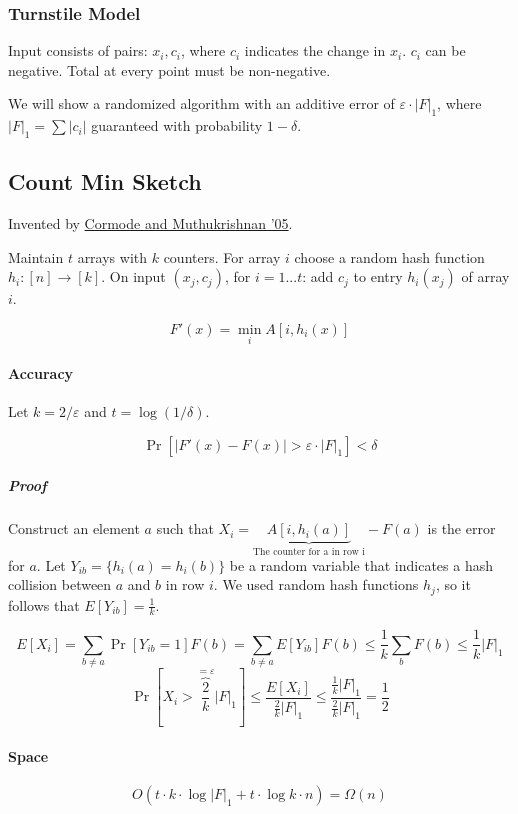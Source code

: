 \documentclass[a4paper]{article}
\begin{document}
\subsubsection{Turnstile Model}
Input consists of pairs: $x_i, c_i$, where $c_i$ indicates the change in $x_i$. $c_i$ can be negative.
Total at every point must be non-negative.

We will show a randomized algorithm with an additive error of $\varepsilon \cdot |F|_1$, where $|F|_1=\sum |c_i|$ guaranteed with probability $1-\delta$.

\subsection{Count Min Sketch}
Invented by \href{http://dimacs.rutgers.edu/~graham/pubs/papers/cm-full.pdf}{Cormode and Muthukrishnan '05}.

Maintain $t$ arrays with $k$ counters.
For array $i$ choose a random hash function $h_i:[n] \to [k]$.
On input $(x_j,c_j)$, for $i=1...t$:
add $c_j$ to entry $h_i(x_j)$ of array $i$.

\[F'(x)=\min_i A[i,h_i(x)]\]

\paragraph{Accuracy}
Let $k=2/ \varepsilon$ and $t=\log (1/\delta)$.

\[\Pr[|F'(x)-F(x)|>\varepsilon \cdot |F|_1] < \delta\]

\subparagraph{Proof}
Construct an element $a$ such that $X_i=\underbrace{A[i,h_i(a)]}_{\text{The counter for a in row i}}-F(a)$ is the error for $a$.
Let $Y_{ib}=\{h_i(a)=h_i(b)\}$ be a random variable that indicates a hash collision between $a$ and $b$ in row $i$.
We used random hash functions $h_j$, so it follows that $E[Y_{ib}]=\frac{1}{k}$.

\[E[X_i]=\sum_{b\ne a} \Pr[Y_{ib}=1]F(b)=\sum_{b\ne a} E[Y_{ib}]F(b) \le \frac{1}{k} \sum_b F(b) \le \frac{1}{k}|F|_1\]
\[\Pr[X_i > \overbrace{\frac{2}{k}}^{=\varepsilon} |F|_1] \le \frac{E[X_i]}{\frac{2}{k}|F|_1} \le \frac{\frac{1}{k}|F|_1}{\frac{2}{k}|F|_1}=\frac{1}{2} \]

\paragraph{Space}

\[O(t \cdot k \cdot \log |F|_1 + t \cdot \log k \cdot n)=\Omega(n)\]
\end{document}
